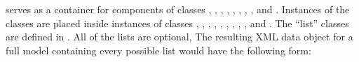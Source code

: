\Model serves as a container for components of classes
\FunctionDefinition, \UnitDefinition, \Compartment, \Species, \Parameter,
\InitialAssignment, \Rule, \Constraint, \Reaction and \Event.
Instances of the classes are placed inside instances of classes
\ListOfFunctionDefinitions, \ListOfUnitDefinitions,
\ListOfCompartments, \ListOfSpecies, \ListOfParameters, \ListOfInitialAssignments,
\ListOfRules, \ListOfConstraints, \ListOfReactions, and
\ListOfEvents.  The ``list'' classes are defined in
.  All of the lists are optional,   The
resulting XML data object for a full model containing every
possible list would have the following form:

\newcommand{\sayOptional}{\raisebox{0pt}[0pt][0pt]{\bigg\} \textrm{\emph{optional}}}}

